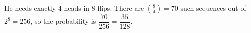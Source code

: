 He needs exactly $4$ heads in $8$ flips. There are $\binom84=70$ such sequences out of $2^8=256$, so the probability is $\dfrac{70}{256}=\boxed{\dfrac{35}{128}}$.
